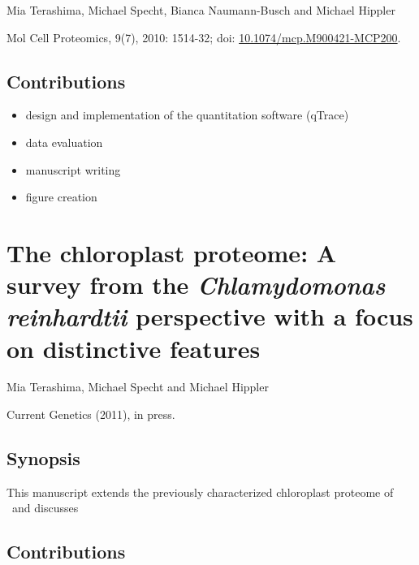 Mia Terashima, Michael Specht, Bianca Naumann-Busch and Michael Hippler

Mol Cell Proteomics, 9(7), 2010: 1514-32; doi: \href{http://dx.doi.org/10.1074/mcp.M900421-MCP200}{10.1074/mcp.M900421-MCP200}.

\subsection*{Contributions}

\begin{itemize}
\item design and implementation of the quantitation software (qTrace)
\item data evaluation
\item manuscript writing
\item figure creation
\end{itemize}

{}

\cleardoublepage
\section{The chloroplast proteome: A survey from the {\em Chlamydomonas reinhardtii} perspective with a focus on distinctive features}

Mia Terashima, Michael Specht and Michael Hippler

Current Genetics (2011), in press.

\subsection*{Synopsis}

This manuscript extends the previously characterized chloroplast proteome
of \cre~and discusses 
\subsection*{Contributions}

